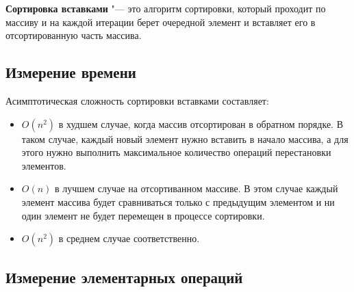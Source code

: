 \documentclass[11pt]{article}
\begin{document}
\textbf{Сортировка вставками} "--- это алгоритм сортировки, который проходит по массиву и на
каждой итерации берет очередной элемент и вставляет его в отсортированную часть массива.

\setcounter{subsection}{0}
\subsection{Измерение времени}

\begin{center}
\end{center}
{ \hspace*{\fill} }

\begin{center}
\end{center}
{ \hspace*{\fill} }

Асимптотическая сложность сортировки вставками составляет:
\begin{itemize}
    \item $O(n^2)$ в худшем случае, когда массив отсортирован в обратном порядке. В таком случае,
          каждый новый элемент нужно вставить в начало массива, а для этого нужно выполнить максимальное количество операций перестановки элементов.
    \item $O(n)$ в лучшем случае на отсортиванном массиве. В этом случае каждый элемент массива будет сравниваться только с предыдущим элементом
          и ни один элемент не будет перемещен в процессе сортировки.
    \item $O(n^2)$ в среднем случае соответственно.
\end{itemize}

\subsection{Измерение элементарных операций}

\begin{center}
\end{center}
{ \hspace*{\fill} }

\begin{center}
\end{center}
{ \hspace*{\fill} }
\end{document}

